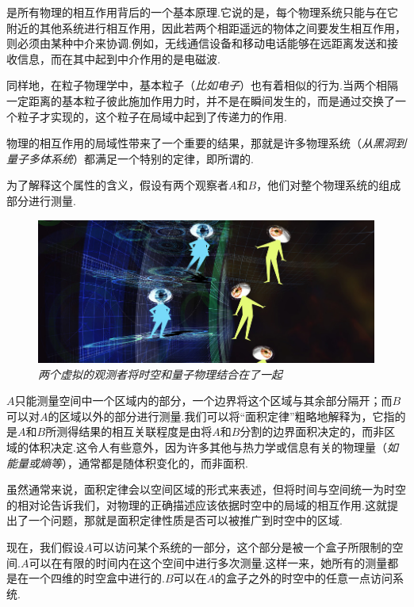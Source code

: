 \begin{multicols}{2}
是所有物理的相互作用背后的一个基本原理.它说的是，每个物理系统只能与在它附近的其他系统进行相互作用，因此若两个相距遥远的物体之间要发生相互作用，则必须由某种中介来协调.例如，无线通信设备和移动电话能够在远距离发送和接收信息，而在其中起到中介作用的是电磁波.

同样地，在粒子物理学中，基本粒子（\textit{比如电子}）也有着相似的行为.当两个相隔一定距离的基本粒子彼此施加作用力时，并不是在瞬间发生的，而是通过交换了一个粒子才实现的，这个粒子在局域中起到了传递力的作用.

物理的相互作用的局域性带来了一个重要的结果，那就是许多物理系统（\textit{从黑洞到量子多体系统}）都满足一个特别的定律，即所谓的.

为了解释这个属性的含义，假设有两个观察者$A$和$B$，他们对整个物理系统的组成部分进行测量.

\begin{figure}[H]
    \centering
    \includegraphics[width=\linewidth]{IMG/201907/csm_slider_quantenkorrelation_1920_2319fd8ab9.jpg}
    \caption{\textit{两个虚拟的观测者将时空和量子物理结合在了一起}}
    
\end{figure}



$A$只能测量空间中一个区域内的部分，一个边界将这个区域与其余部分隔开；而$B$可以对$A$的区域以外的部分进行测量.我们可以将“面积定律”粗略地解释为，它指的是$A$和$B$所测得结果的相互关联程度是由将$A$和$B$分割的边界面积决定的，而非区域的体积决定.这令人有些意外，因为许多其他与热力学或信息有关的物理量（\textit{如能量或熵等}），通常都是随体积变化的，而非面积.

虽然通常来说，面积定律会以空间区域的形式来表述，但将时间与空间统一为时空的相对论告诉我们，对物理的正确描述应该依据时空中的局域的相互作用.这就提出了一个问题，那就是面积定律性质是否可以被推广到时空中的区域.

现在，我们假设$A$可以访问某个系统的一部分，这个部分是被一个盒子所限制的空间.$A$可以在有限的时间内在这个空间中进行多次测量.这样一来，她所有的测量都是在一个四维的时空盒中进行的.$B$可以在$A$的盒子之外的时空中的任意一点访问系统.


\end{multicols}
